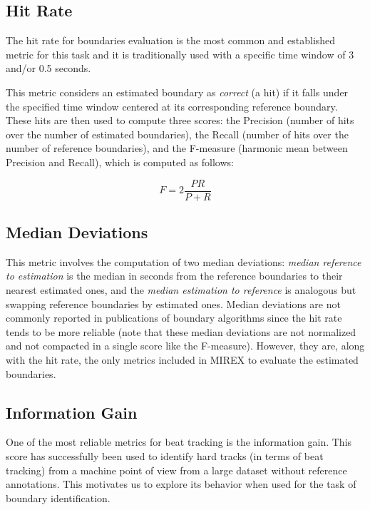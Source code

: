 \documentclass{article}
\begin{document}
\subsection{Hit Rate}

The hit rate for boundaries evaluation is the most common and established metric for this task and it is traditionally used with a specific time window of 3 and/or 0.5 seconds\cite{Ong2005}. 

This metric considers an estimated boundary as \emph{correct} (a hit) if it falls under the specified time window centered at its corresponding reference boundary.
These hits are then used to compute three scores: the Precision (number of hits over the number of estimated boundaries), the Recall (number of hits over the number of reference boundaries), and the F-measure (harmonic mean between Precision and Recall), which is computed as follows:

\begin{equation}
  F = 2 \frac{P R}{P + R}
\end{equation}

\subsection{Median Deviations}

This metric involves the computation of two median deviations: \emph{median reference to estimation} is the median in seconds from the reference boundaries to their nearest estimated ones, and the \emph{median estimation to reference} is analogous but swapping reference boundaries by estimated ones\cite{Pampalk}.
Median deviations are not commonly reported in publications of boundary algorithms since the hit rate tends to be more reliable (note that these median deviations are not normalized and not compacted in a single score like the F-measure).
However, they are, along with the hit rate, the only metrics included in MIREX to evaluate the estimated boundaries.

\subsection{Information Gain}

One of the most reliable metrics for beat tracking is the information gain\cite{Davies2009}. 
This score has successfully been used to identify hard tracks (in terms of beat tracking) from a machine point of view from a large dataset without reference annotations\cite{Holzapfel2012}.
This motivates us to explore its behavior when used for the task of boundary identification.
\end{document}
